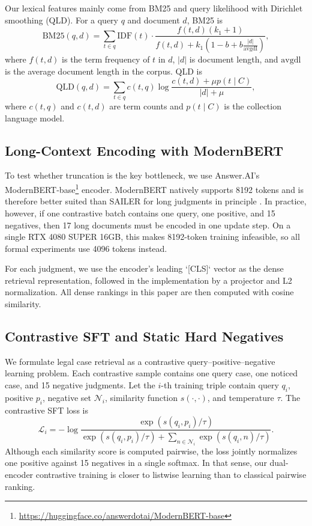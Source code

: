 Our lexical features mainly come from BM25 and query likelihood with Dirichlet smoothing (QLD). For a query $q$ and document $d$, BM25 is
\begin{equation}
\mathrm{BM25}(q,d)=\sum_{t \in q}\mathrm{IDF}(t)\cdot
\frac{f(t,d)(k_1+1)}{f(t,d)+k_1\left(1-b+b\frac{|d|}{\mathrm{avgdl}}\right)},
\end{equation}
where $f(t,d)$ is the term frequency of $t$ in $d$, $|d|$ is document length, and $\mathrm{avgdl}$ is the average document length in the corpus. QLD is
\begin{equation}
\mathrm{QLD}(q,d)=\sum_{t \in q} c(t,q)\log \frac{c(t,d)+\mu p(t \mid C)}{|d|+\mu},
\end{equation}
where $c(t,q)$ and $c(t,d)$ are term counts and $p(t \mid C)$ is the collection language model.

\subsection{Long-Context Encoding with ModernBERT}

\begin{sloppypar}
To test whether truncation is the key bottleneck, we use Answer.AI's ModernBERT-base\footnote{\url{https://huggingface.co/answerdotai/ModernBERT-base}} encoder. ModernBERT natively supports 8192 tokens and is therefore better suited than SAILER for long judgments in principle \cite{warner2024modernbert}. In practice, however, if one contrastive batch contains one query, one positive, and 15 negatives, then 17 long documents must be encoded in one update step. On a single RTX 4080 SUPER 16GB, this makes 8192-token training infeasible, so all formal experiments use 4096 tokens instead.
\end{sloppypar}

For each judgment, we use the encoder's leading `[CLS]` vector as the dense retrieval representation, followed in the implementation by a projector and L2 normalization. All dense rankings in this paper are then computed with cosine similarity.

\subsection{Contrastive SFT and Static Hard Negatives}

We formulate legal case retrieval as a contrastive query--positive--negative learning problem. Each contrastive sample contains one query case, one noticed case, and 15 negative judgments. Let the $i$-th training triple contain query $q_i$, positive $p_i$, negative set $\mathcal{N}_i$, similarity function $s(\cdot,\cdot)$, and temperature $\tau$. The contrastive SFT loss is
\begin{equation}
\mathcal{L}_i=
-\log
\frac{\exp\left(s(q_i,p_i)/\tau\right)}
{\exp\left(s(q_i,p_i)/\tau\right)+\sum_{n \in \mathcal{N}_i}\exp\left(s(q_i,n)/\tau\right)}.
\end{equation}
Although each similarity score is computed pairwise, the loss jointly normalizes one positive against 15 negatives in a single softmax. In that sense, our dual-encoder contrastive training is closer to listwise learning than to classical pairwise ranking.


